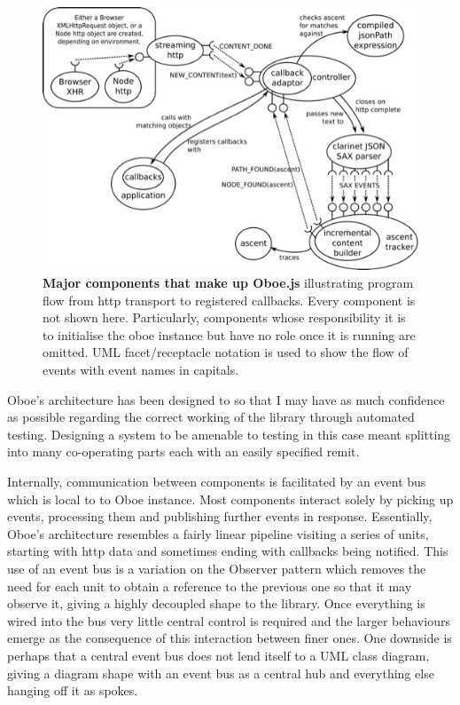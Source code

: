 \documentclass[]{article}
\makeatletter
\def\maxwidth{\ifdim\Gin@nat@width>\linewidth\linewidth
\else\Gin@nat@width\fi}
\let\Oldincludegraphics\includegraphics
\renewcommand{\includegraphics}[1]{\Oldincludegraphics[width=\maxwidth]{#1}}
\makeatother
\begin{document}
\begin{figure}[htbp]
\centering
\includegraphics{images/overallDesign.png}
\caption{\textbf{Major components that make up Oboe.js} illustrating
program flow from http transport to registered callbacks. Every
component is not shown here. Particularly, components whose
responsibility it is to initialise the oboe instance but have no role
once it is running are omitted. UML facet/receptacle notation is used to
show the flow of events with event names in capitals.
\label{overallDesign}}
\end{figure}

Oboe's architecture has been designed to so that I may have as much
confidence as possible regarding the correct working of the library
through automated testing. Designing a system to be amenable to testing
in this case meant splitting into many co-operating parts each with an
easily specified remit.

Internally, communication between components is facilitated by an event
bus which is local to to Oboe instance. Most components interact solely
by picking up events, processing them and publishing further events in
response. Essentially, Oboe's architecture resembles a fairly linear
pipeline visiting a series of units, starting with http data and
sometimes ending with callbacks being notified. This use of an event bus
is a variation on the Observer pattern which removes the need for each
unit to obtain a reference to the previous one so that it may observe
it, giving a highly decoupled shape to the library. Once everything is
wired into the bus very little central control is required and the
larger behaviours emerge as the consequence of this interaction between
finer ones. One downside is perhaps that a central event bus does not
lend itself to a UML class diagram, giving a diagram shape with an event
bus as a central hub and everything else hanging off it as spokes.
\end{document}
